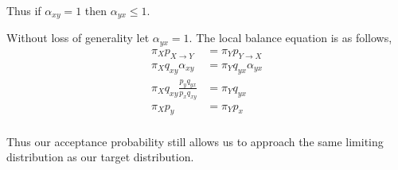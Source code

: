 \documentclass{article}
\begin{document}
Thus if $\alpha_{xy} = 1$ then $\alpha_{yx} \leq 1$.

Without loss of generality let $\alpha_{yx} = 1$.
The local balance equation is as follows,
\begin{align*}
    \pi_{X} p_{X \to Y} &= \pi_{Y} p_{Y \to X} \\
    \pi_{X} q_{xy} \alpha_{xy} &= \pi_{Y} q_{yx} \alpha_{yx} \\
    \pi_{X} q_{xy} \frac{p_y q_{yx}}{p_x q_{xy}} &= \pi_{Y} q_{yx} \\
    \pi_{X} p_y &= \pi_{Y} p_{x} \\
\end{align*}

Thus our acceptance probability still allows us to approach the same
limiting distribution as our target distribution.
\end{document}

